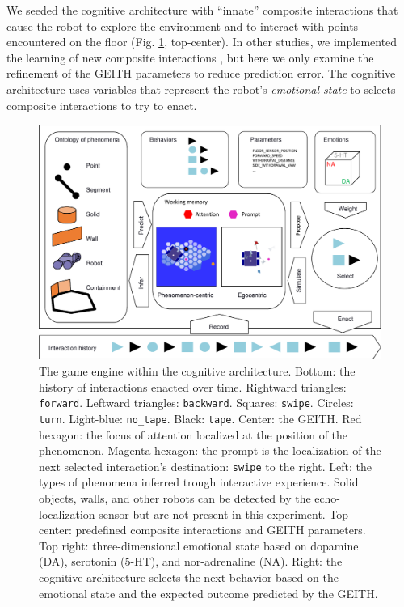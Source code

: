 \documentclass[runningheads]{llncs}
\begin{document}
We seeded the cognitive architecture with ``innate'' composite interactions that cause the robot to explore the environment and to interact with points encountered on the floor (Fig. \ref{fig:geith}, top-center). 
In other studies, we implemented the learning of new composite interactions \cite{georgeon_cash_2019}, but here we only examine the refinement of the GEITH parameters to reduce prediction error.
The cognitive architecture uses variables that represent the robot's \textit{emotional state} to selects composite interactions to try to enact.

\begin{figure}
	\includegraphics[width=\textwidth]{Figure_geith.pdf}
	\caption{The game engine within the cognitive architecture.
		Bottom: the history of interactions enacted over time.
		Rightward triangles: \texttt{forward}. Leftward triangles: \texttt{backward}. Squares: \texttt{swipe}. Circles: \texttt{turn}. Light-blue: \texttt{no\_tape}. Black: \texttt{tape}.
		Center: the GEITH.
		Red hexagon: the focus of attention localized at the position of the phenomenon. 
		Magenta hexagon: the prompt is the localization of the next selected interaction's destination: \texttt{swipe} to the right.
		Left: the types of phenomena inferred trough interactive experience.
		Solid objects, walls, and other robots can be detected by the echo-localization sensor but are not present in this experiment.
		Top center: predefined composite interactions and GEITH parameters.
		Top right: three-dimensional emotional state based on dopamine (DA), serotonin (5-HT), and nor-adrenaline (NA).
		Right: the cognitive architecture selects the next behavior based on the emotional state and the expected outcome predicted by the GEITH.} \label{fig:geith}
\end{figure}
\end{document}
